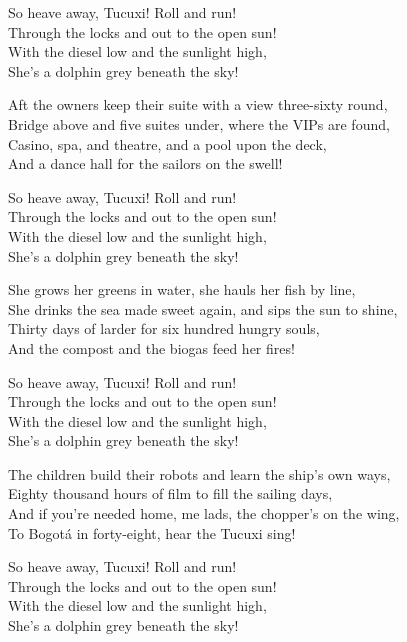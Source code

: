 \begin{lyrics}
So heave away, Tucuxi! Roll and run!\\
Through the locks and out to the open sun!\\
With the diesel low and the sunlight high,\\
She’s a dolphin grey beneath the sky!

Aft the owners keep their suite with a view three-sixty round,\\
Bridge above and five suites under, where the VIPs are found,\\
Casino, spa, and theatre, and a pool upon the deck,\\
And a dance hall for the sailors on the swell!

So heave away, Tucuxi! Roll and run!\\
Through the locks and out to the open sun!\\
With the diesel low and the sunlight high,\\
She’s a dolphin grey beneath the sky!

She grows her greens in water, she hauls her fish by line,\\
She drinks the sea made sweet again, and sips the sun to shine,\\
Thirty days of larder for six hundred hungry souls,\\
And the compost and the biogas feed her fires!

So heave away, Tucuxi! Roll and run!\\
Through the locks and out to the open sun!\\
With the diesel low and the sunlight high,\\
She’s a dolphin grey beneath the sky!

The children build their robots and learn the ship’s own ways,\\
Eighty thousand hours of film to fill the sailing days,\\
And if you’re needed home, me lads, the chopper’s on the wing,\\
To Bogotá in forty-eight, hear the Tucuxi sing!

So heave away, Tucuxi! Roll and run!\\
Through the locks and out to the open sun!\\
With the diesel low and the sunlight high,\\
She’s a dolphin grey beneath the sky!
\end{lyrics}

